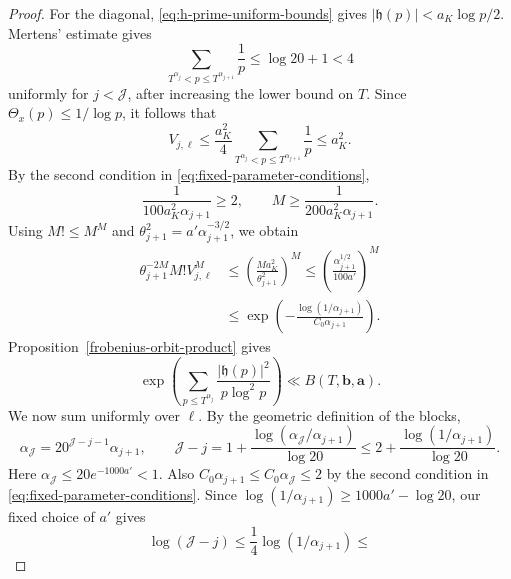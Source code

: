 \documentclass[twoside,reqno,11pt,a4paper]{amsart}
\numberwithin{equation}{section}
\theoremstyle{plain}
\theoremstyle{definition}
\theoremstyle{remark}
\renewcommand{\le}{\leqslant}
\renewcommand{\ge}{\geqslant}
\begin{document}
\begin{proof}
For the diagonal, \eqref{eq:h-prime-uniform-bounds} gives
$|\mathfrak h(p)|<a_K\log p/2$.  Mertens' estimate gives
\begin{equation*}
        \sum_{T^{\alpha_j}<p\le T^{\alpha_{j+1}}}\frac1p
        \le\log20+1<4
\end{equation*}
uniformly for $j<\mathcal J$, after increasing the lower bound on $T$.
Since $\Theta_x(p)\le1/\log p$, it follows that
\begin{equation*}
        V_{j,\ell}
        \le
        \frac{a_K^2}{4}\sum_{T^{\alpha_j}<p\le  T^{\alpha_{j+1}}}\frac1p
        \le a_K^2.
\end{equation*}
By the second condition in \eqref{eq:fixed-parameter-conditions},
\begin{equation*}
        \frac{1}{100a_K^2\alpha_{j+1}}\ge2,
        \qquad
        M\ge\frac{1}{200a_K^2\alpha_{j+1}}.
\end{equation*}
Using $M!\le M^M$ and $\theta_{j+1}^2=a'\alpha_{j+1}^{-3/2}$, we obtain
\begin{align}\label{eq:second-lemma-saving}
        \theta_{j+1}^{-2M}M!V_{j,\ell}^M
        &\le
        \left(\frac{Ma_K^2}{\theta_{j+1}^2}\right)^M
        \le
        \left(\frac{\alpha_{j+1}^{1/2}}{100a'}\right)^M                                      \\
        &\le
        \exp\left(-\frac{\log(1/\alpha_{j+1})}{C_0\alpha_{j+1}}\right).
\end{align}
Proposition~\ref{frobenius-orbit-product} gives
\begin{equation*}
        \exp\left(
        \sum_{p\le  T^{\alpha_j}}\frac{|\mathfrak h(p)|^2}{p\log^2p}
        \right)
        \ll B(T,\mathbf b,\mathbf a).
\end{equation*}
We now sum uniformly over $\ell$. By the geometric definition of the blocks,
\begin{equation*}
        \alpha_{\mathcal J}
        =20^{\mathcal J-j-1}\alpha_{j+1},
        \qquad
        \mathcal J-j
        =1+\frac{\log(\alpha_{\mathcal J}/\alpha_{j+1})}{\log20}
        \le
        2+\frac{\log(1/\alpha_{j+1})}{\log20}.
\end{equation*}
Here $\alpha_{\mathcal J}\le20e^{-1000a'}<1$.  Also
$C_0\alpha_{j+1}\le C_0\alpha_{\mathcal J}\le2$ by the second
condition in \eqref{eq:fixed-parameter-conditions}.  Since
$\log(1/\alpha_{j+1})\ge1000a'-\log20$, our fixed choice of $a'$ gives
\begin{equation*}
        \log(\mathcal J-j)
        \le\frac14\log(1/\alpha_{j+1})
        \le

\end{equation*}
\end{proof}
\end{document}
